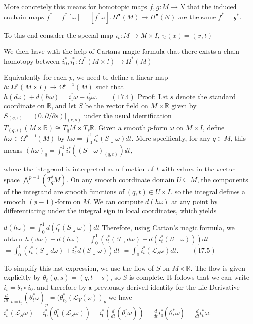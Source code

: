 More concretely this means for homotopic maps \( f,g : M \to N \) that the induced cochain maps 
\( f^\ast = f^\ast[\omega] = [f^\ast \omega] : H^\bullet(M) \to H^\bullet(N)\) are the same \( f^\ast = g^\ast \).

To this end consider the special map \( i_t : M \to M \times I,\ i_t(x) = (x, t) \)

We then have with the help of Cartans magic formula
that there exists a chain homotopy between \( i_0^\ast, i_1^\ast : \Omega^\ast(M \times I) \to \Omega^\ast(M)\)

Equivalently for each \(p\), we need to define a linear map \(h:\Omega^{p}(M\times I)\rightarrow\Omega^{p-1}(M)\)
such that
\(h(d\omega) + d(h\omega) = i_1^*\omega - i_0^*\omega. \qquad (17.4)\)
Proof:
Let \(s\) denote the standard coordinate on \(\mathbb{R}\), and let \(S\) be the vector field on \(M \times \mathbb{R}\)
given by \(S_{(q,s)} = (0, \partial / \partial s)|_{(q,s)}\) under the usual identification \(T_{(q,s)}(M \times \mathbb{R}) \cong T_qM \times T_s \mathbb{R}\). 
Given a smooth \(p\)-form \(\omega\) on \(M \times I\), define \(h\omega \in \Omega^{p-1}(M)\) by
\(h\omega=\int_{0}^{1}i_{t}^{*}(S \lrcorner \omega)dt.\)
More specifically, for any \(q \in M\), this means
\((h\omega)_{q}=\int_{0}^{1}i_{t}^{*}((S \lrcorner \omega)_{(q,t)})dt,\)

where the integrand is interpreted as a function of \(t\) with values in the vector space
\(\bigwedge^{p-1}(T^*_q M)\). On any smooth coordinate domain \(U \subseteq M\), the components of the
integrand are smooth functions of \((q,t) \in U \times I\). so the integral defines a smooth
\((p-1)\)-form on \(M\). We can compute \(d(h\omega)\) at any point by differentiating under
the integral sign in local coordinates, which yields

\(d(h\omega)=\int_{0}^{1}d(i_{t}^{*}(S \lrcorner \omega))dt\)
Therefore, using Cartan's magic formula, we obtain
\(h(d\omega)+d(h\omega)=\int_{0}^{1}(i_{t}^{*}(S \lrcorner d\omega)+d(i_{t}^{*}(S \lrcorner \omega)))dt\)
\(=\int_{0}^{1}(i_{t}^{*}(S \lrcorner d\omega)+i_{t}^{*}d(S \lrcorner \omega))dt\)
\(=\int_{0}^{1}i_{t}^{*}(\mathcal{L}_{S}\omega)dt. \qquad (17.5)\)

To simplify this last expression, we use the flow of \(S\) on \(M \times \mathbb{R}\). 
The flow is given explicitly by \(\theta_{t}(q,s)=(q,t+s)\), so \(S\) is complete. It
follows that we can write \(i_{t}=\theta_{t} \circ i_{0}\), and therefore by a previously derived identity for the Lie-Derivative 
\( \frac{d}{dt}|_{t = t_0}(\theta^\ast_t \omega)_p = (\theta^\ast_{t_0}(\mathcal{L}_V(\omega))_p \)
we have
\(i_{t}^{*}(\mathcal{L}_{S}\omega)=i_{0}^{*}(\theta_{t}^{*}(\mathcal{L}_{S}\omega))=i_{0}^{*}(\frac{d}{dt}(\theta_{t}^{*}\omega))=\frac{d}{dt}i_{0}^{*}(\theta_{t}^{*}\omega)=\frac{d}{dt}i_{t}^{*}\omega.\)

